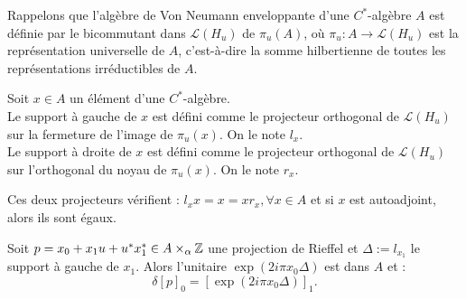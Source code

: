 Rappelons que l'algèbre de Von Neumann enveloppante d'une $C^*$-algèbre $A$ est définie par le bicommutant dans $\mathcal L(H_u)$ de $\pi_u(A)$, où $\pi_u : A\rightarrow \mathcal L(H_u)$ est la représentation universelle de $A$, c'est-à-dire la somme hilbertienne de toutes les représentations irréductibles de $A$.

\begin{definition}
Soit $x\in A$ un élément d'une $C^*$-algèbre.\\
 Le support à gauche de $x$ est défini comme le projecteur orthogonal de $\mathcal L(H_u)$ sur la fermeture de l'image de $\pi_u(x)$. On le note $l_x$.\\
  Le support à droite de $x$ est défini comme le projecteur orthogonal de $\mathcal L(H_u)$ sur l'orthogonal du noyau de $\pi_u(x)$. On le note $r_x$.
\end{definition}
 
Ces deux projecteurs vérifient : $l_x x =x = x r_x, \forall x \in A$ et si $x$ est autoadjoint, alors ils sont égaux.\\

\begin{prop}
Soit $p=x_0+x_1 u +u^*x_1^*\in A\times_\alpha \mathbb Z$ une projection de Rieffel et $\Delta := l_{x_1}$ le support à gauche de $x_1$. Alors l'unitaire $\exp(2i\pi x_0 \Delta)$ est dans $A$ et :
\[\delta [p]_0=[\exp(2i\pi x_0 \Delta)]_1.\] 
\end{prop}

